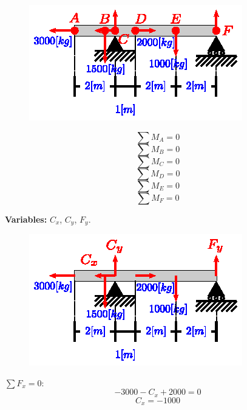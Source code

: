 \documentclass[letter,10pt,twoside]{article}
\begin{document}
\begin{figure}[H]
\centering
\includegraphics[scale=1.8]{resources/g05.eps}
\end{figure}

\begin{equation*}
    \sum{M_A} = 0
\end{equation*}
\begin{equation*}
    \sum{M_B} = 0
\end{equation*}
\begin{equation*}
    \sum{M_C} = 0
\end{equation*}
\begin{equation*}
    \sum{M_D} = 0
\end{equation*}
\begin{equation*}
    \sum{M_E} = 0
\end{equation*}
\begin{equation*}
    \sum{M_F} = 0
\end{equation*}

\textbf{Variables:} $C_x$, $C_y$, $F_y$.
\\

\begin{figure}[H]
\centering
\includegraphics[scale=1.8]{resources/h05.eps}
\end{figure}

$\sum{F_x} = 0$:
\begin{equation*}
    -3000 - C_x + 2000 = 0
\end{equation*}
\begin{equation*}
    C_x = -1000
\end{equation*}
\end{document}
